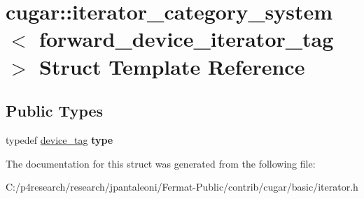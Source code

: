 \hypertarget{structcugar_1_1iterator__category__system_3_01forward__device__iterator__tag_01_4}{}\section{cugar\+:\+:iterator\+\_\+category\+\_\+system$<$ forward\+\_\+device\+\_\+iterator\+\_\+tag $>$ Struct Template Reference}
\label{structcugar_1_1iterator__category__system_3_01forward__device__iterator__tag_01_4}
\subsection*{Public Types}
\begin{DoxyCompactItemize}
\item 
\mbox{\label{structcugar_1_1iterator__category__system_3_01forward__device__iterator__tag_01_4_ac8e328cd8637d1e63a8d0b4553daa615}} 
typedef \hyperlink{structcugar_1_1device__tag}{device\+\_\+tag} {\bfseries type}
\end{DoxyCompactItemize}


The documentation for this struct was generated from the following file\+:\begin{DoxyCompactItemize}
\item 
C\+:/p4research/research/jpantaleoni/\+Fermat-\/\+Public/contrib/cugar/basic/iterator.\+h\end{DoxyCompactItemize}
